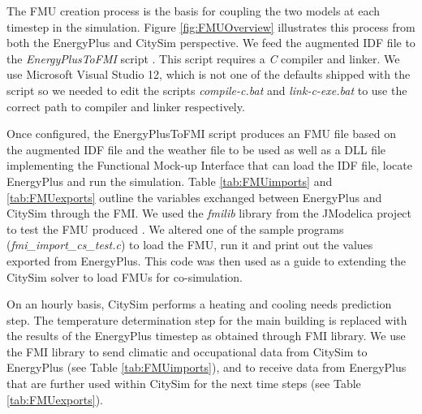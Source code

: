 \documentclass{tBPS2e}
\theoremstyle{plain}
\theoremstyle{definition}
\theoremstyle{remark}
\begin{document}
The FMU creation process is the basis for coupling the two models at each timestep in the simulation. Figure \ref{fig:FMUOverview} illustrates this process from both the EnergyPlus and CitySim perspective. We feed the augmented IDF file to the \emph{EnergyPlusToFMI} script
\citep{Nouidui:2014bo}. This script requires a \emph{C} compiler and linker. We
use Microsoft Visual Studio 12, which is not one of the defaults shipped with
the script so we needed to edit the scripts \emph{compile-c.bat} and
\emph{link-c-exe.bat} to use the correct path to compiler and linker
respectively.

Once configured, the EnergyPlusToFMI script produces an FMU file based on the
augmented IDF file and the weather file to be used as well as a DLL file
implementing the Functional Mock-up Interface that can load the IDF file, locate
EnergyPlus and run the simulation. Table \ref{tab:FMUimports} and
\ref{tab:FMUexports} outline the variables exchanged between EnergyPlus and
CitySim through the FMI. We used the \emph{fmilib} library from the JModelica
project to test the FMU produced \citep{Anonymous:ZZTfF80-}. We altered one of the sample programs
(\emph{fmi\_import\_cs\_test.c}) to load the FMU, run it and print out the values
exported from EnergyPlus. This code was then used as a guide to extending the
CitySim solver to load FMUs for co-simulation.

On an hourly basis, CitySim performs a heating and
cooling needs prediction step. The temperature determination step
for the main building is replaced with the results of the EnergyPlus timestep as obtained
through FMI library. We use the FMI library to send climatic and occupational data 
from CitySim to EnergyPlus (see Table \ref{tab:FMUimports}), and to receive
data from EnergyPlus that are further used within CitySim for the next time
steps (see Table \ref{tab:FMUexports}).
\end{document}
